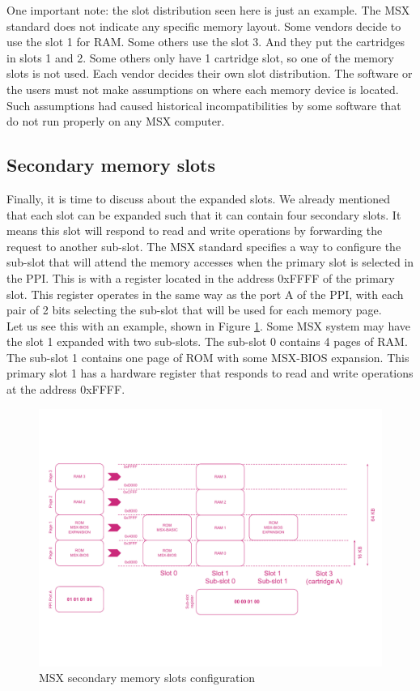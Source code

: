 One important note: the slot distribution seen here is just an example. The MSX standard does not indicate any specific memory layout. Some vendors decide to use the slot 1 for RAM. Some others use the slot 3. And they put the cartridges in slots 1 and 2. Some others only have 1 cartridge slot, so one of the memory slots is not used. Each vendor decides their own slot distribution. The software or the users must not make assumptions on where each memory device is located. Such assumptions had caused historical incompatibilities by some software that do not run properly on any MSX computer.

\subsection{Secondary memory slots}

Finally, it is time to discuss about the expanded slots. We already mentioned that each slot can be expanded such that it can contain four secondary slots. It means this slot will respond to read and write operations by forwarding the request to another sub-slot. The MSX standard specifies a way to configure the sub-slot that will attend the memory accesses when the primary slot is selected in the PPI. This is with a register located in the address 0xFFFF of the primary slot. This register operates in the same way as the port A of the PPI, with each pair of 2 bits selecting the sub-slot that will be used for each memory page. \\

Let us see this with an example, shown in Figure \ref{fig:msx-mem-slotssec}. Some MSX system may have the slot 1 expanded with two sub-slots. The sub-slot 0 contains 4 pages of RAM. The sub-slot 1 contains one page of ROM with some MSX-BIOS expansion. This primary slot 1 has a hardware register that responds to read and write operations at the address 0xFFFF. \\

\begin{figure}
	\centering
	\includegraphics[width=1\linewidth,trim={0cm 100 0 80}]{images/figures/msx-mem-slotssec}
	\caption{MSX secondary memory slots configuration}
	\label{fig:msx-mem-slotssec}
\end{figure}

